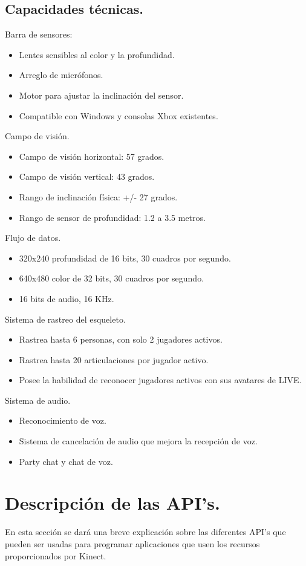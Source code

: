 \documentclass[11pt,a4paper]{article}
\begin{document}
\subsection{Capacidades técnicas\cite{rakuten}.} 
Barra de sensores:
\begin{itemize} %
	\item Lentes sensibles al color y la profundidad.
	\item Arreglo de micrófonos.
	\item Motor para ajustar la inclinación del sensor.
	\item Compatible con Windows y consolas Xbox existentes.
\end{itemize}
Campo de visión.
\begin{itemize} 
	\item Campo de visión horizontal: 57 grados.
	\item Campo de visión vertical: 43 grados.
	\item Rango de inclinación física: +/- 27 grados.
	\item Rango de sensor de profundidad:  1.2 a 3.5 metros.
\end{itemize}
Flujo de datos. 
\begin{itemize} 
	\item 320x240  profundidad de 16 bits, 30 cuadros por segundo.
	\item 640x480 color de 32 bits, 30 cuadros por segundo.
	\item 16 bits de audio, 16 KHz.
\end{itemize}
Sistema de rastreo del esqueleto.
\begin{itemize} 
	\item Rastrea hasta 6 personas, con solo 2 jugadores activos.
	\item Rastrea hasta 20 articulaciones por jugador activo.
	\item Posee la habilidad de reconocer jugadores activos con sus avatares de LIVE.
\end{itemize}
Sistema de audio.
\begin{itemize} 
	\item Reconocimiento de voz.
	\item Sistema de cancelación de audio que mejora la recepción de voz.
	\item Party chat y chat de voz.
\end{itemize}

\section{Descripción de las API's.}
En esta sección se dará una breve explicación sobre las diferentes \gls{API}'s que pueden ser usadas para programar aplicaciones que usen los recursos proporcionados por Kinect. 
\end{document}
